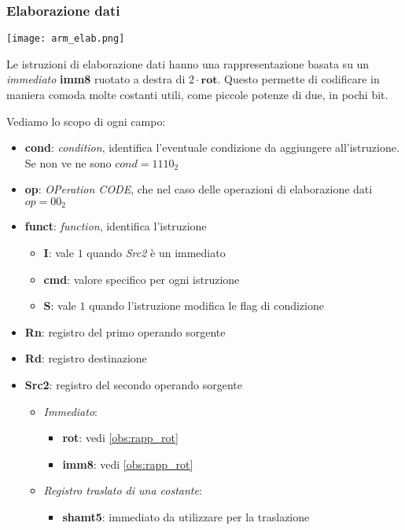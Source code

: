 \subsubsection{Elaborazione dati}
\begin{center}
	\texttt{[image: arm\_elab.png]}
\end{center}
\begin{observation}
	\label{obs:rapp_rot}
	Le istruzioni di elaborazione dati hanno una rappresentazione basata su un \textit{immediato} \textbf{imm8} ruotato a destra di $2 \cdot \mathbf{rot}$. Questo permette di codificare in maniera comoda molte costanti utili, come piccole potenze di due, in pochi bit.
\end{observation}
Vediamo lo scopo di ogni campo:
\begin{itemize}
	\item \textbf{cond}: \textit{condition}, identifica l'eventuale condizione da aggiungere all'istruzione. Se non ve ne sono $cond=1110_2$ \label{it:cond}
	\item \textbf{op}: \textit{OPeration CODE}, che nel caso delle operazioni di elaborazione dati $op = 00_2$
	\item \textbf{funct}: \textit{function}, identifica l'istruzione
	\begin{itemize}
		\item \textbf{I}: vale $1$ quando \textit{Src2} è un immediato
		\item \textbf{cmd}: valore specifico per ogni istruzione
		\item \textbf{S}: vale $1$ quando l'istruzione modifica le flag di condizione
	\end{itemize}
	\item \textbf{Rn}: registro del primo operando sorgente \label{it:rn}
	\item \textbf{Rd}: registro destinazione \label{it:rd}
	\item \textbf{Src2}: registro del secondo operando sorgente
	\begin{itemize}
		\item \textit{Immediato}:
		\begin{itemize}
			\item \textbf{rot}: vedi \ref{obs:rapp_rot}
			\item \textbf{imm8}: vedi \ref{obs:rapp_rot}
		\end{itemize}
		\item \textit{Registro traslato di una costante}:
		\begin{itemize}
			\item \textbf{shamt5}: immediato da utilizzare per la traslazione

\end{itemize}
\end{itemize}
\end{itemize}
